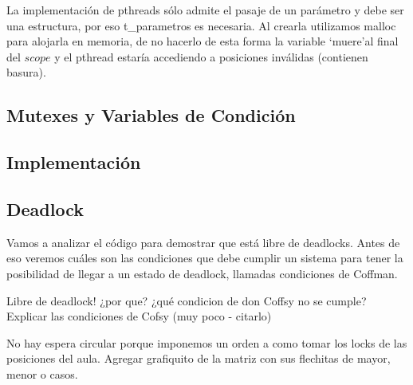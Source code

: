 La implementación de pthreads sólo admite el pasaje de un parámetro y debe
ser una estructura, por eso t\_parametros es necesaria. Al crearla utilizamos malloc para alojarla en memoria, 
de no hacerlo de esta forma la variable \textquoteleft muere\textquoteright	 al final del $scope$ y
el pthread estaría accediendo a posiciones inválidas (contienen basura).

\subsection{Mutexes y Variables de Condición}



\subsection{Implementación}

\subsection{Deadlock}
Vamos a analizar el código para demostrar que está libre de deadlocks.
Antes de eso veremos cuáles son las condiciones que debe cumplir un sistema para tener la posibilidad de llegar a un estado de deadlock, llamadas
condiciones de Coffman.

Libre de deadlock! ¿por que? ¿qué condicion de don Coffsy no se cumple?
Explicar las condiciones de Cofsy (muy poco - citarlo)

No hay espera circular porque imponemos un orden a como tomar los locks de las posiciones del aula. 
Agregar grafiquito de la matriz con sus flechitas de mayor, menor o casos.

